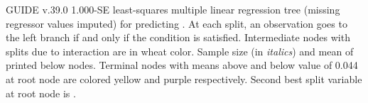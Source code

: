 \documentclass{article}
\begin{document}
\begin{landscape}
\begin{center}
{ }
 \end{center}
GUIDE v.39.0 1.000-SE
least-squares multiple linear regression tree
 (missing regressor values imputed)
for predicting \texttt{}.
At each split, an observation goes to the left branch 
 if and only if the condition is satisfied.
 Intermediate nodes with splits due to interaction are in wheat color.
Sample size (in \emph{italics}) and mean of \texttt{} printed below nodes.
 Terminal nodes with means above and below value of  0.044  at root node are colored yellow and purple respectively.
 Second best split variable at root node is \texttt{}.
 \end{landscape}
 
\end{document}
